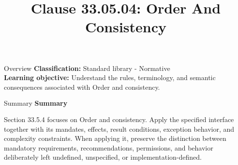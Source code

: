 \documentclass[10pt,letterpaper]{article}
\title{Clause 33.05.04: Order And Consistency}
\author{}
\date{}
\begin{document}
\maketitle
\begin{CornellOverviewBox}{Overview}
\textbf{Classification:} Standard library - Normative\\[2pt]
\textbf{Learning objective:} Understand the rules, terminology, and semantic consequences associated with Order and consistency.
\end{CornellOverviewBox}\begin{CornellSummaryBox}{Summary}
{\sffamily\bfseries\color{Accent} Summary}\par\vspace{3pt}Section 33.5.4 focuses on Order and consistency. Apply the specified interface together with its mandates, effects, result conditions, exception behavior, and complexity constraints. When applying it, preserve the distinction between mandatory requirements, recommendations, permissions, and behavior deliberately left undefined, unspecified, or implementation-defined.
\end{CornellSummaryBox}
\end{document}
